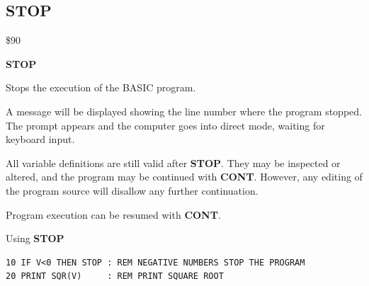 
\newpage
\subsection{STOP}
\begin{description}[leftmargin=2cm,style=nextline]
\item [Token:]    \$90

\item [Format:]   {\bf STOP}

\item [Usage:]    Stops the execution of the BASIC program.

                  A message will be displayed showing the line number where the program stopped. The  prompt appears and the computer goes into direct mode, waiting for keyboard input.

\item [Remarks:]  All variable definitions are still valid after {\bf STOP}. They may be inspected or altered, and the program may be continued with {\bf CONT}. However, any editing of the program source will disallow any further continuation.

                  Program execution can be resumed with {\bf CONT}.

\item [Example:]  Using {\bf STOP}

\begin{tcolorbox}[colback=black,coltext=white]
\verbatimfont{\codefont}
\begin{verbatim}
10 IF V<0 THEN STOP : REM NEGATIVE NUMBERS STOP THE PROGRAM
20 PRINT SQR(V)     : REM PRINT SQUARE ROOT
\end{verbatim}
\end{tcolorbox}
\end{description}


\newpage
